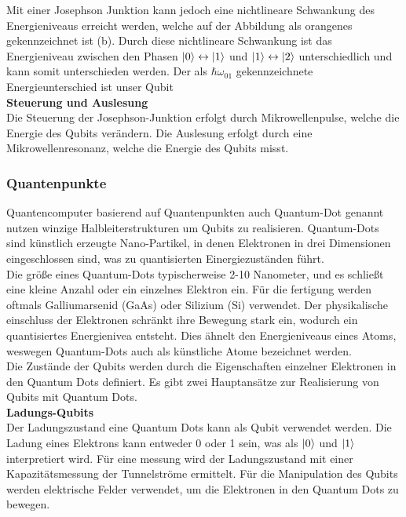 Mit einer Josephson Junktion kann jedoch eine nichtlineare Schwankung des Energieniveaus erreicht werden, welche auf der Abbildung als orangenes  gekennzeichnet ist (b).
Durch diese nichtlineare Schwankung ist das Energieniveau zwischen den Phasen $\ket{0} \leftrightarrow \ket{1}$ und $\ket{1} \leftrightarrow \ket{2}$ unterschiedlich und kann somit unterschieden werden.
Der als $\hbar\omega_{01}$ gekennzeichnete Energieunterschied ist unser Qubit\\

\textbf{Steuerung und Auslesung}\\
Die Steuerung der Josephson-Junktion erfolgt durch Mikrowellenpulse, welche die Energie des Qubits verändern. Die Auslesung erfolgt durch eine Mikrowellenresonanz, welche die Energie des Qubits misst.\\

\subsubsection{Quantenpunkte}
\label{subsub:quantenpunkte}
Quantencomputer basierend auf Quantenpunkten auch Quantum-Dot genannt nutzen winzige Halbleiterstrukturen um Qubits zu realisieren.
Quantum-Dots sind künstlich erzeugte Nano-Partikel, in denen Elektronen in drei Dimensionen eingeschlossen sind, was zu quantisierten Einergiezuständen führt.\\

Die größe eines Quantum-Dots typischerweise 2-10 Nanometer, und es schließt eine kleine Anzahl oder ein einzelnes Elektron ein.
Für die fertigung werden oftmals Galliumarsenid (GaAs) oder Silizium (Si) verwendet. Der physikalische einschluss der Elektronen schränkt ihre
Bewegung stark ein, wodurch ein quantisiertes Energienivea entsteht. Dies ähnelt den Energieniveaus eines Atoms, weswegen Quantum-Dots auch als künstliche Atome bezeichnet werden.\\

Die Zustände der Qubits werden durch die Eigenschaften einzelner Elektronen in den Quantum Dots definiert. Es gibt zwei Hauptansätze zur Realisierung von Qubits mit Quantum Dots.\\

\textbf{Ladungs-Qubits}\\
Der Ladungszustand eine Quantum Dots kann als Qubit verwendet werden. Die Ladung eines Elektrons kann entweder 0 oder 1 sein, was als $\ket{0}$ und $\ket{1}$ interpretiert wird.
Für eine messung wird der Ladungszustand mit einer Kapazitätsmessung der Tunnelströme ermittelt.
Für die Manipulation des Qubits werden elektrische Felder verwendet, um die Elektronen in den Quantum Dots zu bewegen.\\

